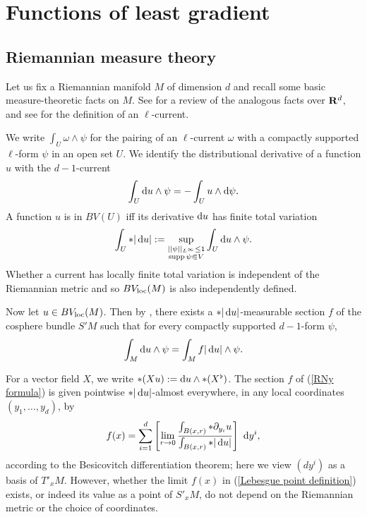 \section{Functions of least gradient}\label{LeastGradientFunctions}
\subsection{Riemannian measure theory}
Let us fix a Riemannian manifold $M$ of dimension $d$ and recall some basic measure-theoretic facts on $M$.
See \cite[Chapter 1]{Giusti77} for a review of the analogous facts over $\mathbf{R}^d$, and see \cite{simon1983GMT} for the definition of an $\ell$-current.

We write $\int_U \omega \wedge \psi$ for the pairing of an $\ell$-current $\omega$ with a compactly supported $\ell$-form $\psi$ in an open set $U$.
We identify the distributional derivative of a function $u$ with the $d-1$-current
$$\int_U \mathop{}\!\mathrm{d} u \wedge \psi = -\int_U u \wedge \mathop{}\!\mathrm{d} \psi.$$
A function $u$ is in $BV(U)$ iff its derivative $\mathop{}\!\mathrm{d} u$ has finite total variation
$$\int_U *|\mathop{}\!\mathrm{d} u| := \sup_{\substack{||\psi||_{L^\infty} \leq 1\\\operatorname{supp} \psi \Subset V}} \int_U \mathop{}\!\mathrm{d} u \wedge \psi.$$
Whether a current has locally finite total variation is independent of the Riemannian metric and so $BV_{\mathrm{loc}}(M)$ is also independently defined.

Now let $u \in BV_{\mathrm{loc}}(M)$.
Then by \cite[Theorem 4.14]{simon1983GMT}, there exists a $*|\mathop{}\!\mathrm{d} u|$-measurable section $f$ of the cosphere bundle $S'M$ such that for every compactly supported $d-1$-form $\psi$,
\begin{equation}\label{RNy formula}
\int_M \mathop{}\!\mathrm{d} u \wedge \psi = \int_M f|\mathop{}\!\mathrm{d} u| \wedge \psi.
\end{equation}

For a vector field $X$, we write $*(Xu) := \mathop{}\!\mathrm{d} u \wedge *(X^\flat)$.
The section $f$ of (\ref{RNy formula}) is given pointwise $*|\mathop{}\!\mathrm{d} u|$-almost everywhere, in any local coordinates $(y_1, \dots, y_d)$, by
\begin{equation}\label{Lebesgue point definition}
    f(x) = \sum_{i = 1}^d \left[\lim_{r \to 0} \frac{\int_{B(x, r)} *\partial_{y_i} u}{\int_{B(x, r)} *|\mathop{}\!\mathrm{d} u|}\right] ~\mathop{}\!\mathrm{d} y^i,
\end{equation}
according to the Besicovitch differentiation theorem; here we view $(dy^i)$ as a basis of $T'_xM$.
However, whether the limit $f(x)$ in (\ref{Lebesgue point definition}) exists, or indeed its value as a point of $S'_xM$, do not depend on the Riemannian metric or the choice of coordinates.

